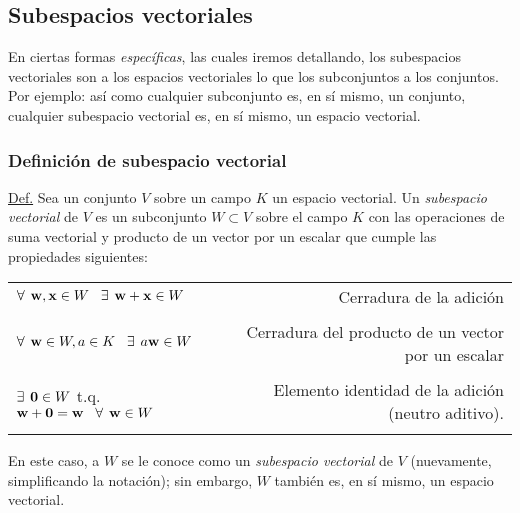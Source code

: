 \documentclass[12pt]{article}
\begin{document}
\newpage
\subsection{Subespacios vectoriales}

En ciertas formas \emph{específicas}, las cuales iremos detallando, los subespacios vectoriales son a los espacios vectoriales lo que los subconjuntos a los conjuntos. Por ejemplo: así como cualquier subconjunto es, en sí mismo, un conjunto, cualquier subespacio vectorial es, en sí mismo, un espacio vectorial.

\subsubsection{Definición de subespacio vectorial} \label{Def:Subespacio_vectorial}

\begin{tcolorbox}
\underline{Def.} Sea un conjunto $V$ sobre un campo $K$ un espacio vectorial. Un \textit{subespacio vectorial} de $V$ es un subconjunto $W\subset V$ sobre el campo $K$ con las operaciones de suma vectorial y producto de un vector por un escalar que cumple las propiedades siguientes:

\begin{center}
\begin{tabular}{lr}
    $\forall\hspace{1.5mm} \mathbf{w},\mathbf{x}\in W \hspace{3mm}\exists \hspace{1.5mm} \mathbf{w}+\mathbf{x}\in W$ & Cerradura de la adición \\ \\ \multirow{2}{0.4\textwidth}{$\forall\hspace{1.5mm} \mathbf{w}\in W, a\in K \hspace{3mm}\exists \hspace{1.5mm} a\mathbf{w}\in W$} & \multirow{2}{0.28\textwidth}{Cerradura del producto de un vector por un escalar} \\ \\ \\
    $\exists \hspace{1.5mm} \mathbf{0}\in W$ t.q. $\mathbf{w}+\mathbf{0}=\mathbf{w}\hspace{3mm}\forall\hspace{1.5mm} \mathbf{w} \in W$ & Elemento identidad de la adición (neutro aditivo). \\ \\
\end{tabular}
\end{center}

\hspace{2.5mm} En este caso, a $W$ se le conoce como un \textit{subespacio vectorial} de $V$ (nuevamente, simplificando la notación); sin embargo, $W$ también es, en sí mismo, un espacio vectorial.

\end{tcolorbox}{}
\end{document}

